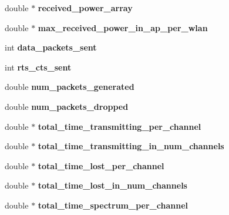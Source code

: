\begin{DoxyCompactItemize}
double $\ast$ {\bfseries received\+\_\+power\+\_\+array}
\item 
\mbox{\label{classcompcxx__Node__23_a7378359c5ccb5dd7ffb8bbaf3382f614}} 
double $\ast$ {\bfseries max\+\_\+received\+\_\+power\+\_\+in\+\_\+ap\+\_\+per\+\_\+wlan}
\item 
\mbox{\label{classcompcxx__Node__23_a9e5d14c8147b488170ea502c9f6319a4}} 
int {\bfseries data\+\_\+packets\+\_\+sent}
\item 
\mbox{\label{classcompcxx__Node__23_aff3f606bb8209b2aef5af503abac632d}} 
int {\bfseries rts\+\_\+cts\+\_\+sent}
\item 
\mbox{\label{classcompcxx__Node__23_af2601eaf1578f1bae047f6c9897a0059}} 
double {\bfseries num\+\_\+packets\+\_\+generated}
\item 
\mbox{\label{classcompcxx__Node__23_a87cb64afdedce09bab70622938a0061e}} 
double {\bfseries num\+\_\+packets\+\_\+dropped}
\item 
\mbox{\label{classcompcxx__Node__23_aa6c4857bc3e951f7094ea02553b57573}} 
double $\ast$ {\bfseries total\+\_\+time\+\_\+transmitting\+\_\+per\+\_\+channel}
\item 
\mbox{\label{classcompcxx__Node__23_ab553f93495b0934f5ae079862ad6718c}} 
double $\ast$ {\bfseries total\+\_\+time\+\_\+transmitting\+\_\+in\+\_\+num\+\_\+channels}
\item 
\mbox{\label{classcompcxx__Node__23_a321f430db5c70e6d79922c85e369dac3}} 
double $\ast$ {\bfseries total\+\_\+time\+\_\+lost\+\_\+per\+\_\+channel}
\item 
\mbox{\label{classcompcxx__Node__23_aa21b6f11353e168d5f59a918c91e884b}} 
double $\ast$ {\bfseries total\+\_\+time\+\_\+lost\+\_\+in\+\_\+num\+\_\+channels}
\item 
\mbox{\label{classcompcxx__Node__23_a4647ca3e5a8a9cda3fb08d90a84a3544}} 
double $\ast$ {\bfseries total\+\_\+time\+\_\+spectrum\+\_\+per\+\_\+channel}

\end{DoxyCompactItemize}
